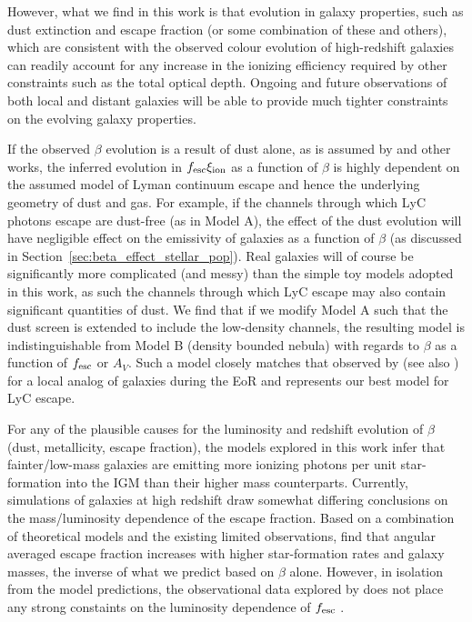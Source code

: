 However, what we find in this work is that evolution in galaxy properties, such as dust extinction and escape fraction (or some combination of these and others), which are consistent with the observed colour evolution of high-redshift galaxies can readily account for any increase in the ionizing efficiency required by other constraints such as the total optical depth. Ongoing and future observations of both local and distant galaxies will be able to provide much tighter constraints on the evolving galaxy properties.

If the observed $\beta$ evolution is a result of dust alone, as is assumed by \citet{2012ApJ...754...83B} and other works, the inferred evolution in $f_{\rm{esc}}\xi_{\rm{ion}}$ as a function of $\beta$ is highly dependent on the assumed model of Lyman continuum escape and hence the underlying geometry of dust and gas. For example, if the channels through which LyC photons escape are dust-free (as in Model A),  the effect of the dust evolution will have negligible effect on the emissivity of galaxies as a function of $\beta$ (as discussed in Section~\ref{sec:beta_effect_stellar_pop}). Real galaxies will of course be significantly more complicated (and messy) than the simple toy models adopted in this work, as such the channels through which LyC escape may also contain significant quantities of dust.  We find that if we modify Model A such that the dust screen is extended to include the low-density channels, the resulting model is indistinguishable from Model B (density bounded nebula) with regards to $\beta$ as a function of $f_{\rm{esc}}$ or $A_{V}$. Such a model closely matches that observed by \citet{Borthakur:2014bz} (see also \citep{Heckman:2011ju}) for a local analog of galaxies during the EoR and represents our best model for LyC escape. 

For any of the plausible causes for the luminosity and redshift evolution of $\beta$ (dust, metallicity, escape fraction), the models explored in this work infer that fainter/low-mass galaxies are emitting more ionizing photons per unit star-formation into the IGM than their higher mass counterparts. Currently, simulations of galaxies at high redshift draw somewhat differing conclusions on the mass/luminosity dependence of the escape fraction. Based on a combination of theoretical models and the existing limited observations, \citet{Gnedin:2008ib} find that angular averaged escape fraction increases with higher star-formation rates and galaxy masses, the inverse of what we predict based on $\beta$ alone. However, in isolation from the model predictions, the observational data explored by \citet{Gnedin:2008ib} does not place any strong constaints on the luminosity dependence of $f_{\rm{esc}}$ \citep{Giallongo:2002hi,FernandezSoto:2003ev,Shapley:2006cq}.

